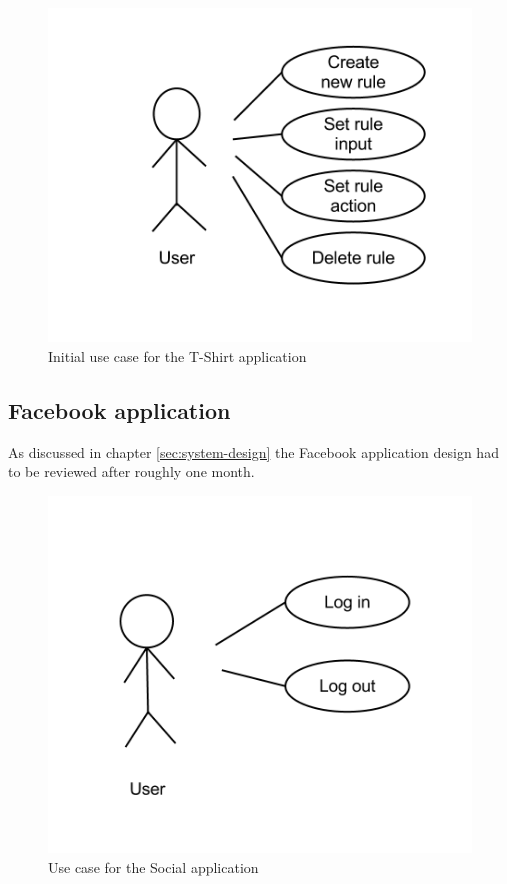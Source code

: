 \begin{figure}[h!]
\centering \includegraphics[scale=0.35]{img/design-tshirtappusecase1}
\caption{Initial use case for the T-Shirt application}
\label{fig:design-tshirtappusecase1}
\end{figure}

\subsection{Facebook application}

As discussed in chapter \ref{sec:system-design} the Facebook application design had to be reviewed after roughly one month.

\begin{figure}[h!]
\centering \includegraphics[scale=0.35]{img/design-socialappusecase2}
\caption{Use case for the Social application}
\label{fig:design-socialappusecase2}
\end{figure}

